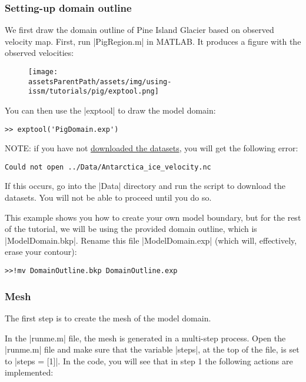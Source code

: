 \subsubsection{Setting-up domain outline} %
We first draw the domain outline of Pine Island Glacier based on observed velocity map. First, run \lstinlinebg|PigRegion.m| in MATLAB. It produces a figure with the observed velocities:
\begin{figure}[H]
	\begin{center}
		\texttt{[image: \\assetsParentPath/assets/img/using-issm/tutorials/pig/exptool.png]}
	\end{center}
\end{figure}

You can then use the \lstinlinebg|exptool| to draw the model domain:
\begin{lstlisting}
>> exptool('PigDomain.exp')
\end{lstlisting}

NOTE: if you have not 
\hyperref[sec:using-issm-tutorials-datasets]{downloaded the datasets},
you will get the following error:
\begin{lstlisting}
Could not open ../Data/Antarctica_ice_velocity.nc
\end{lstlisting}
If this occurs, go into the \lstinlinebg|Data| directory and run the script to download the datasets. You will not be able to proceed until you do so.

This example shows you how to create your own model boundary, but for the rest of the tutorial, we will be using the provided domain outline, which is \lstinlinebg|ModelDomain.bkp|. Rename this file \lstinlinebg|ModelDomain.exp| (which will, effectively, erase your contour):
\begin{lstlisting}
>>!mv DomainOutline.bkp DomainOutline.exp
\end{lstlisting}
\subsubsection{Mesh}%
The first step is to create the mesh of the model domain.

In the \lstinlinebg|runme.m| file, the mesh is generated in a multi-step process. Open the \lstinlinebg|runme.m| file and make sure that the variable \lstinlinebg|steps|, at the top of the file, is set to \lstinlinebg|steps = [1]|. In the code, you will see that in step 1 the following actions are implemented:

